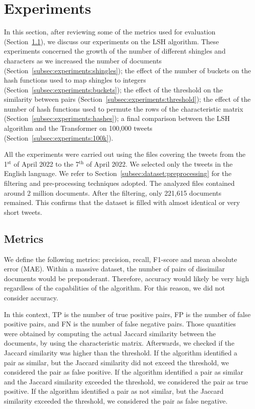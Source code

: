 \documentclass[runningheads]{llncs}
\begin{document}
\section{Experiments}
\label{sec:experiments}

In this section, after reviewing some of the metrics used for evaluation (Section~\ref{subsec:experiments:metrics}), we discuss our experiments on the LSH algorithm. These experiments concerned the growth of the number of different shingles and characters as we increased the number of documents (Section~\ref{subsec:experiments:shingles}); the effect of the number of buckets on the hash functions used to map shingles to integers (Section~\ref{subsec:experiments:buckets}); the effect of the threshold on the similarity between pairs (Section~\ref{subsec:experiments:threshold}); the effect of the number of hash functions used to permute the rows of the characteristic matrix (Section~\ref{subsec:experiments:hashes}); a final comparison between the LSH algorithm and the Transformer on 100,000 tweets (Section~\ref{subsec:experiments:100k}).

All the experiments were carried out using the files covering the tweets from the 1$^{\text{st}}$ of April 2022 to the 7$^{\text{th}}$ of April 2022. We selected only the tweets in the English language. We refer to Section~\ref{subsec:dataset:preprocessing} for the filtering and pre-processing techniques adopted. The analyzed files contained around 2 million documents. After the filtering, only 221,615 documents remained. This confirms that the dataset is filled with almost identical or very short tweets. 

\subsection{Metrics}
\label{subsec:experiments:metrics}

We define the following metrics: precision, recall, F1-score and mean absolute error (MAE). Within a massive dataset, the number of pairs of dissimilar documents would be preponderant. Therefore, accuracy would likely be very high regardless of the capabilities of the algorithm.
For this reason, we did not consider accuracy. 

In this context, TP is the number of true positive pairs, FP is the number of false positive pairs, and FN is the number of false negative pairs. Those quantities were obtained by computing the actual Jaccard similarity between the documents, by using the characteristic matrix. Afterwards, we checked if the Jaccard similarity was higher than the threshold.
If the algorithm identified a pair as similar, but the Jaccard similarity did not exceed the threshold, we considered the pair as false positive. If the algorithm identified a pair as similar and the Jaccard similarity exceeded the threshold, we considered the pair as true positive. If the algorithm identified a pair as not similar, but the Jaccard similarity exceeded the threshold, we considered the pair as false negative.
\end{document}
